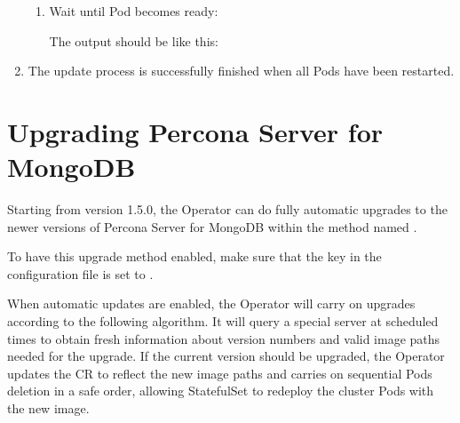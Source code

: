 \documentclass[letterpaper,10pt,english]{sphinxmanual}
\begin{document}
\begin{enumerate}
\begin{enumerate}
\item {} 
Wait until Pod becomes ready:

\begin{sphinxVerbatim}[commandchars=\\\{\}]
   
\end{sphinxVerbatim}

The output should be like this:

\begin{sphinxVerbatim}[commandchars=\\\{\}]
                              
                     
\end{sphinxVerbatim}

\end{enumerate}

\item {} 
The update process is successfully finished when all Pods have been
restarted.

\end{enumerate}


\section{Upgrading Percona Server for MongoDB}
\label{\detokenize{update:upgrading-percona-server-for-mongodb}}\label{\detokenize{update:operator-update-smartupdates}}
Starting from version 1.5.0, the Operator can do fully automatic upgrades to
the newer versions of Percona Server for MongoDB within the method named .

To have this upgrade method enabled, make sure that the  key
in the  configuration file is set to .

When automatic updates are enabled, the Operator will carry on upgrades
according to the following algorithm. It will query a special 
server at scheduled times to obtain fresh information about version numbers and
valid image paths needed for the upgrade. If the current version should be
upgraded, the Operator updates the CR to reflect the new image paths and carries
on sequential Pods deletion in a safe order, allowing StatefulSet to redeploy
the cluster Pods with the new image.
\end{document}
